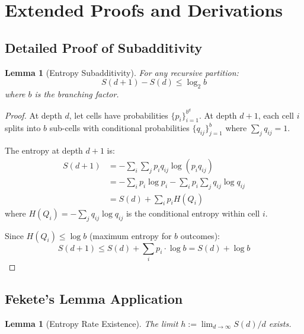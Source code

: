 \documentclass[11pt,a4paper]{article}
\newtheorem{lemma}[theorem]{Lemma}
\theoremstyle{definition}
\theoremstyle{remark}
\begin{document}
\appendix

\section{Extended Proofs and Derivations}
\label{app:proofs}

\subsection{Detailed Proof of Subadditivity}

\begin{lemma}[Entropy Subadditivity]
\label{lem:subadditivity}
For any recursive partition:
\begin{equation}
    S(d+1) - S(d) \leq \log_2 b
\end{equation}
where $b$ is the branching factor.
\end{lemma}

\begin{proof}
At depth $d$, let cells have probabilities $\{p_i\}_{i=1}^{b^d}$. At depth $d+1$, each cell $i$ splits into $b$ sub-cells with conditional probabilities $\{q_{ij}\}_{j=1}^b$ where $\sum_j q_{ij} = 1$.

The entropy at depth $d+1$ is:
\begin{align}
    S(d+1) &= -\sum_i \sum_j p_i q_{ij} \log(p_i q_{ij}) \\
    &= -\sum_i p_i \log p_i - \sum_i p_i \sum_j q_{ij} \log q_{ij} \\
    &= S(d) + \sum_i p_i H(Q_i)
\end{align}
where $H(Q_i) = -\sum_j q_{ij} \log q_{ij}$ is the conditional entropy within cell $i$.

Since $H(Q_i) \leq \log b$ (maximum entropy for $b$ outcomes):
\begin{equation}
    S(d+1) \leq S(d) + \sum_i p_i \cdot \log b = S(d) + \log b
\end{equation}
\end{proof}

\subsection{Fekete's Lemma Application}

\begin{lemma}[Entropy Rate Existence]
The limit $h := \lim_{d \to \infty} S(d)/d$ exists.
\end{lemma}
\end{document}
